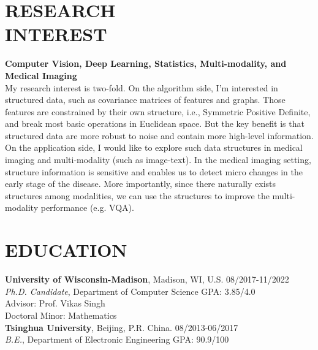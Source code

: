 \documentclass[margin]{res}
\begin{document}
\begin{resume}
\vspace{-2em}
\section{RESEARCH \\ INTEREST}
                \textbf{Computer Vision, Deep Learning, Statistics, Multi-modality, and Medical Imaging}\\
                My research interest is two-fold. On the algorithm side, I'm interested in structured data, such as covariance matrices of features and graphs. Those features are constrained by their own structure, i.e., Symmetric Positive Definite, and break most basic operations in Euclidean space. But the key benefit is that structured data are more robust to noise and contain more high-level information. On the application side, I would like to explore such data structures in medical imaging and multi-modality (such as image-text). In the medical imaging setting, structure information is sensitive and enables us to detect micro changes in the early stage of the disease. More importantly, since there naturally exists structures among modalities, we can use the structures to improve the multi-modality performance (e.g. VQA).                 
                
\vspace{-1em}
\section{EDUCATION} 
                {\bf University of Wisconsin-Madison}, Madison, WI, U.S. \hfill 08/2017-11/2022\\
                {\sl {Ph.D. Candidate}}, Department of Computer Science \hfill GPA: 3.85/4.0\\
                {Advisor:} Prof. Vikas Singh\\
                {Doctoral Minor:} Mathematics\\
                {\bf Tsinghua University}, Beijing, P.R. China. \hfill 08/2013-06/2017\\
                {\sl {B.E.}}, Department of Electronic Engineering \hfill GPA: 90.9/100


\end{resume}
\end{document}
